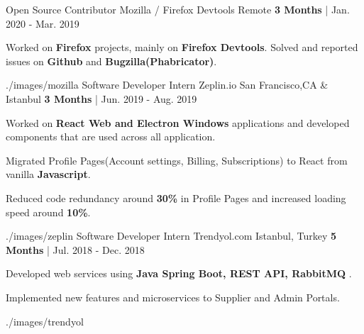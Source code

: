 \begin{cventries}
  \cventrywithimage
   {Open Source Contributor} %
    {Mozilla / Firefox Devtools} %
    {Remote} %
    {\textbf{3 Months} | Jan. 2020 - Mar. 2019} %
    {
      \begin{cvitems} %
        \item {Worked on \textbf{Firefox} projects, mainly on \textbf{Firefox Devtools}. Solved and reported issues on \textbf{Github} and \textbf{Bugzilla(Phabricator)}.}
      \end{cvitems}
    }
    {./images/mozilla}
  \cventrywithimage
   {Software Developer Intern} %
    {Zeplin.io} %
    {San Francisco,CA \& Istanbul} %
    {\textbf{3 Months} | Jun. 2019 - Aug. 2019} %
    {
      \begin{cvitems} %
        \item {Worked on \textbf{React Web and Electron Windows} applications and developed components that are used across all application.}
		\item {Migrated Profile Pages(Account settings, Billing, Subscriptions) to React from vanilla \textbf{Javascript}.}
        \item {Reduced code redundancy around \textbf{30\%} in Profile Pages and increased loading speed around \textbf{10\%}. }
      \end{cvitems}
    }
    {./images/zeplin}
  \cventrywithimage
   {Software Developer Intern} %
    {Trendyol.com} %
    {Istanbul, Turkey} %
    {\textbf{5 Months} | Jul. 2018 - Dec. 2018} %
    {
      \begin{cvitems} %
		    \item {Developed web services using \textbf{Java Spring Boot, REST API, RabbitMQ} .}
        \item {Implemented new features and microservices to Supplier and Admin Portals.}
      \end{cvitems}
    }
    {./images/trendyol}
\begin{comment}

\end{comment}
\end{cventries}
